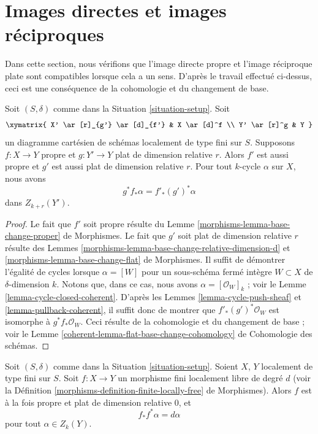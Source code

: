 \section{Images directes et images réciproques}
\label{section-push-pull}

\noindent
Dans cette section, nous vérifions que l'image directe propre et l'image réciproque plate
sont compatibles lorsque cela a un sens. D'après le travail effectué ci-dessus, ceci
est une conséquence de la cohomologie et du changement de base.

\begin{lemma}
\label{lemma-flat-pullback-proper-pushforward}
Soit $(S, \delta)$ comme dans la Situation \ref{situation-setup}.
Soit
$$
\xymatrix{
X' \ar[r]_{g'} \ar[d]_{f'} & X \ar[d]^f \\
Y' \ar[r]^g & Y
}
$$
un diagramme cartésien de schémas localement de type fini sur $S$.
Supposons $f : X \to Y$ propre et $g : Y' \to Y$ plat de dimension relative $r$.
Alors $f'$ est aussi propre et $g'$ est aussi plat de dimension relative $r$.
Pour tout $k$-cycle $\alpha$ sur $X$, nous avons
$$
g^*f_*\alpha = f'_*(g')^*\alpha
$$
dans $Z_{k + r}(Y')$.
\end{lemma}

\begin{proof}
Le fait que $f'$ soit propre résulte du
Lemme \ref{morphisms-lemma-base-change-proper} de Morphismes.
Le fait que $g'$ soit plat de dimension relative $r$ résulte des
Lemmes \ref{morphisms-lemma-base-change-relative-dimension-d}
et \ref{morphisms-lemma-base-change-flat} de Morphismes.
Il suffit de démontrer l'égalité de cycles lorsque $\alpha = [W]$
pour un sous-schéma fermé intègre $W \subset X$ de $\delta$-dimension $k$.
Notons que, dans ce cas, nous avons $\alpha = [\mathcal{O}_W]_k$ ; voir le
Lemme \ref{lemma-cycle-closed-coherent}.
D'après les Lemmes \ref{lemma-cycle-push-sheaf} et
\ref{lemma-pullback-coherent}, il suffit donc
de montrer que $f'_*(g')^*\mathcal{O}_W$ est isomorphe à
$g^*f_*\mathcal{O}_W$. Ceci résulte de la cohomologie et du
changement de base ; voir le
Lemme \ref{coherent-lemma-flat-base-change-cohomology} de Cohomologie des schémas.
\end{proof}

\begin{lemma}
\label{lemma-finite-flat}
Soit $(S, \delta)$ comme dans la Situation \ref{situation-setup}.
Soient $X$, $Y$ localement de type fini sur $S$.
Soit $f : X \to Y$ un morphisme fini localement libre
de degré $d$ (voir la
Définition \ref{morphisms-definition-finite-locally-free} de Morphismes).
Alors $f$ est à la fois propre et plat de dimension relative $0$, et
$$
f_*f^*\alpha = d\alpha
$$
pour tout $\alpha \in Z_k(Y)$.
\end{lemma}


